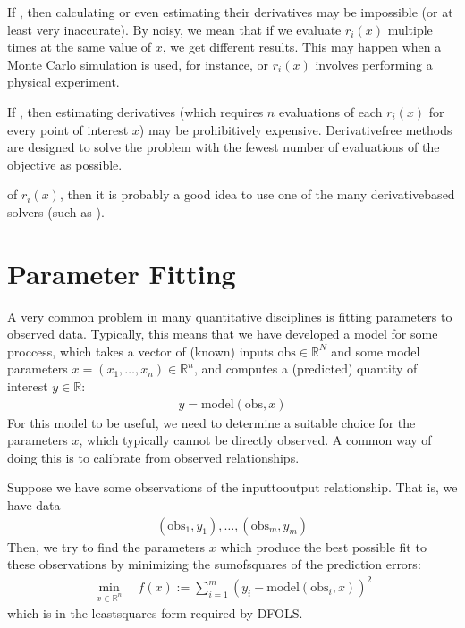 \documentclass[letterpaper,10pt,english]{sphinxmanual}
\begin{document}
If , then calculating or even estimating their derivatives may be impossible (or at least very inaccurate). By noisy, we mean that if we evaluate \(r_i(x)\) multiple times at the same value of \(x\), we get different results. This may happen when a Monte Carlo simulation is used, for instance, or \(r_i(x)\) involves performing a physical experiment.

If , then estimating derivatives (which requires \(n\) evaluations of each \(r_i(x)\) for every point of interest \(x\)) may be prohibitively expensive. Derivative\sphinxhyphen{}free methods are designed to solve the problem with the fewest number of evaluations of the objective as possible.

 of \(r_i(x)\), then it is probably a good idea to use one of the many derivative\sphinxhyphen{}based solvers (such as ).


\section{Parameter Fitting}
\label{\detokenize{info:parameter-fitting}}
A very common problem in many quantitative disciplines is fitting parameters to observed data. Typically, this means that we have developed a model for some proccess, which takes a vector of (known) inputs \(\mathrm{obs}\in\mathbb{R}^N\) and some model parameters \(x=(x_1, \ldots, x_n)\in\mathbb{R}^n\), and computes a (predicted) quantity of interest \(y\in\mathbb{R}\):
\begin{equation*}
\begin{split}y = \mathrm{model}(\mathrm{obs}, x)\end{split}
\end{equation*}
For this model to be useful, we need to determine a suitable choice for the parameters \(x\), which typically cannot be directly observed. A common way of doing this is to calibrate from observed relationships.

Suppose we have some observations of the input\sphinxhyphen{}to\sphinxhyphen{}output relationship. That is, we have data
\begin{equation*}
\begin{split}(\mathrm{obs}_1, y_1), \ldots, (\mathrm{obs}_m, y_m)\end{split}
\end{equation*}
Then, we try to find the parameters \(x\) which produce the best possible fit to these observations by minimizing the sum\sphinxhyphen{}of\sphinxhyphen{}squares of the prediction errors:
\begin{equation*}
\begin{split}\min_{x\in\mathbb{R}^n}  \quad  f(x) := \sum_{i=1}^{m}(y_i - \mathrm{model}(\mathrm{obs}_i, x))^2\end{split}
\end{equation*}
which is in the least\sphinxhyphen{}squares form required by DFO\sphinxhyphen{}LS.
\end{document}
